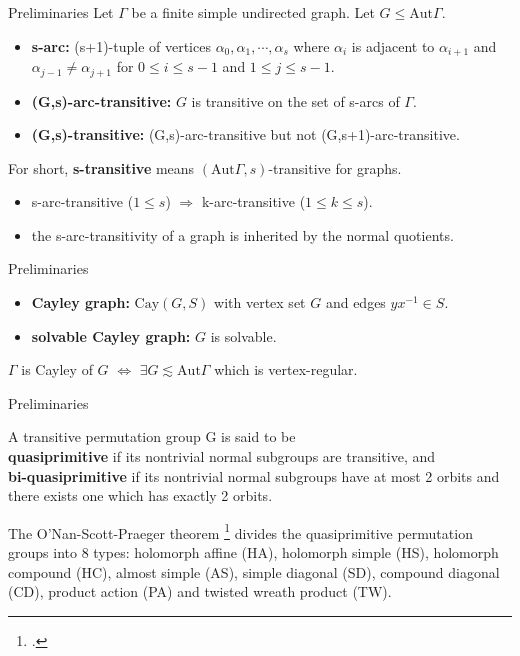 \documentclass{beamer}
\def\Aut{\mathrm{Aut}}
\def\Cay{\mathrm{Cay}}
\begin{document}
\begin{frame}{Preliminaries}
Let $\Gamma$ be a finite simple undirected graph. Let $G\leq \Aut\Gamma$.
\begin{definition}
	\begin{itemize}
		\item \textbf{s-arc:} (s+1)-tuple of vertices $\alpha_0,\alpha_1,\cdots,\alpha_s$ where $\alpha_i$ is adjacent to $\alpha_{i+1}$ and $\alpha_{j-1}\neq\alpha_{j+1}$ for $0\leq i\leq s-1$ and $1\leq j\leq s-1$.
		\item \textbf{(G,s)-arc-transitive:} $G$ is transitive on the set of s-arcs of $\Gamma$.
		\item \textbf{(G,s)-transitive:} (G,s)-arc-transitive but not (G,s+1)-arc-transitive.
	\end{itemize}
For short, \textbf{s-transitive} means $(\Aut\Gamma,s)$-transitive for graphs.
\end{definition}
\begin{lemma}
	\begin{itemize}
		\item s-arc-transitive ($1\leq s$) $\Longrightarrow$ k-arc-transitive ($1\leq k\leq s$).
		\item the s-arc-transitivity of a graph is inherited by the normal quotients.
	\end{itemize} 
\end{lemma}
\end{frame}

\begin{frame}{Preliminaries}
\begin{definition}
	\begin{itemize}
		\item \textbf{Cayley graph:} $\Cay(G,S)$ with vertex set $G$ and edges $yx^{-1}\in S$.
		\item \textbf{solvable Cayley graph:} $G$ is solvable.
	\end{itemize}
\end{definition}
\begin{lemma}
	\center $\Gamma$ is Cayley of $G$ $\iff$ $\exists G\lesssim \Aut\Gamma$ which is vertex-regular.
\end{lemma}
\end{frame}

\begin{frame}{Preliminaries}
\begin{definition}
	A transitive permutation group G is said to be \\\textbf{quasiprimitive} if its nontrivial normal subgroups are transitive, and \\\textbf{bi-quasiprimitive} if its nontrivial normal subgroups have at most 2 orbits and there exists one which has exactly 2 orbits.
\end{definition}

The O'Nan-Scott-Praeger theorem \footcite{praeger_1997} divides the quasiprimitive permutation groups into 8 types: holomorph affine (HA), holomorph simple (HS), holomorph compound (HC), almost simple (AS), simple diagonal (SD), compound diagonal (CD), product action (PA) and twisted wreath product (TW).
\end{frame}
\end{document}
